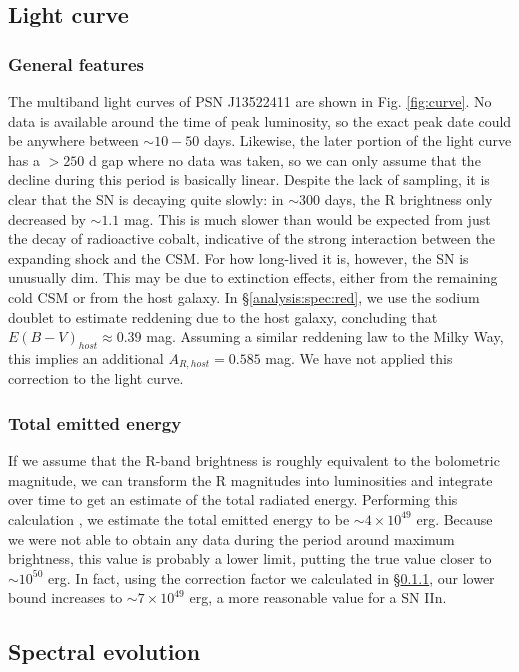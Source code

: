 \documentclass[iop]{emulateapj}
\begin{document}
\subsection{Light curve} \label{analysis:curve}
\subsubsection{General features} \label{analysis:curve:gen}
The multiband light curves of PSN J13522411 are shown in Fig. \ref{fig:curve}. No data is available around the time of peak luminosity, so the exact peak date could be anywhere between $\sim10-50$ days. Likewise, the later portion of the light curve has a $>250$ d gap where no data was taken, so we can only assume that the decline during this period is basically linear. Despite the lack of sampling, it is clear that the SN is decaying quite slowly: in $\sim300$ days, the R brightness only decreased by $\sim1.1$ mag. This is much slower than would be expected from just the decay of radioactive cobalt, indicative of the strong interaction between the expanding shock and the CSM. For how long-lived it is, however, the SN is unusually dim. This may be due to extinction effects, either from the remaining cold CSM or from the host galaxy. In \S \ref{analysis:spec:red}, we use the sodium doublet to estimate reddening due to the host galaxy, concluding that $E(B-V)_{host} \approx 0.39$ mag. Assuming a similar reddening law to the Milky Way, this implies an additional $A_{R,host} = 0.585$ mag. We have not applied this correction to the light curve.

\subsubsection{Total emitted energy} \label{analysis:curve:energy}
If we assume that the R-band brightness is roughly equivalent to the bolometric magnitude, we can transform the R magnitudes into luminosities and integrate over time to get an estimate of the total radiated energy. Performing this calculation \citep{Are99}, we estimate the total emitted energy to be $\sim4 \times 10^{49}$ erg. Because we were not able to obtain any data during the period around maximum brightness, this value is probably a lower limit, putting the true value closer to $\sim10^{50}$ erg. In fact, using the correction factor we calculated in \S \ref{analysis:curve:gen}, our lower bound increases to $\sim7 \times 10^{49}$ erg, a more reasonable value for a SN IIn.

\subsection{Spectral evolution} \label{analysis:spec}
\end{document}
